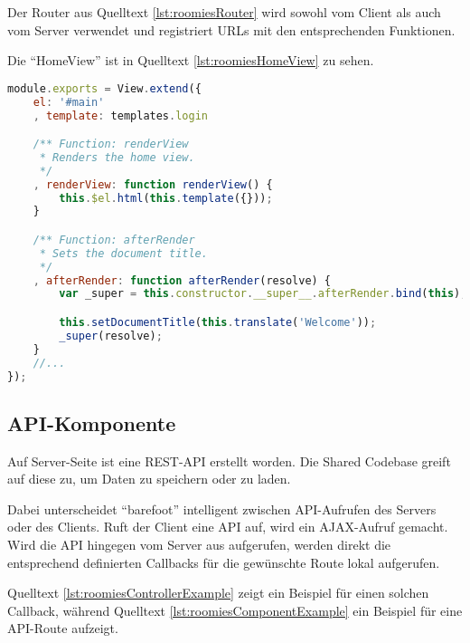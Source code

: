 Der Router aus Quelltext \ref{lst:roomiesRouter} wird sowohl vom Client als auch vom Server verwendet und registriert URLs mit den entsprechenden Funktionen.

Die ``HomeView'' ist in Quelltext \ref{lst:roomiesHomeView} zu sehen.

\begin{lstlisting}[language=JavaScript, caption=Ausschnitt aus HomeView der Beispielapplikation \cite{roomiesHomeView}, label=lst:roomiesHomeView, firstnumber=7]
module.exports = View.extend({
	el: '#main'
	, template: templates.login

	/** Function: renderView
	 * Renders the home view.
	 */
	, renderView: function renderView() {
		this.$el.html(this.template({}));
	}

	/** Function: afterRender
	 * Sets the document title.
	 */
	, afterRender: function afterRender(resolve) {
		var _super = this.constructor.__super__.afterRender.bind(this);

		this.setDocumentTitle(this.translate('Welcome'));
		_super(resolve);
	}
	//...
});
\end{lstlisting}

\subsection*{API-Komponente}
Auf Server-Seite ist eine REST-API \cite{REST} erstellt worden. Die Shared Codebase greift auf diese zu, um Daten zu speichern oder zu laden.

Dabei unterscheidet ``barefoot'' intelligent zwischen API-Aufrufen des Servers oder des Clients.
Ruft der Client eine API auf, wird ein AJAX-Aufruf gemacht. Wird die API
hingegen vom Server aus aufgerufen, werden direkt die entsprechend definierten
Callbacks für die gewünschte Route lokal aufgerufen.

Quelltext \ref{lst:roomiesControllerExample} zeigt ein Beispiel für einen solchen
Callback, während Quelltext \ref{lst:roomiesComponentExample} ein Beispiel für
eine API-Route aufzeigt.


